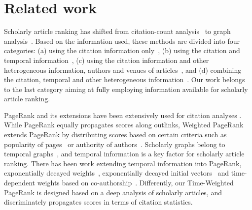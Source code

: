 
\section{Related work} \label{sec-related}



Scholarly article ranking has shifted from citation-count analysis~\cite{Garfield471,Hirsch15112005} to graph analysis~\cite{Waltman2014,Jiang12-MRank,Liang16AAAI,Li08TSRanking,Wang13AAAI,WalkerXKM07,sayyadi09,
Wang16TIST,Ng11KDD}.
Based on the information used, these methods are divided into four categories: (a) using the citation information only~\cite{Garfield471,Hirsch15112005,Ng11KDD}, (b) using the citation and temporal information~\cite{Li08TSRanking,WalkerXKM07}, (c) using the citation information and other heterogeneous information, \eg authors and venues of articles~\cite{Jiang12-MRank,Liang16AAAI}, and (d) combining the citation, temporal and other heterogeneous information~\cite{sayyadi09,Wang16TIST,Wang13AAAI}.
Our work belongs to the last category aiming at fully employing information available for scholarly article ranking.
%



PageRank \cite{Brin98:PageRank} and its extensions have been extensively used for citation analyses \cite{Waltman2014}. While PageRank equally propagates scores along outlinks, Weighted PageRank extends PageRank by distributing scores based on certain criteria such as popularity of pages~\cite{Xing04:WPR} or authority of authors~\cite{Ding11}.
Scholarly graphs belong to temporal graphs~\cite{temporalgraph}, and temporal information is a key factor for scholarly article ranking.
There has been work extending temporal information into PageRank, \eg exponentially decayed weights~\cite{Li08TSRanking}, exponentially decayed initial vectors~\cite{WalkerXKM07} and time-dependent weights based on co-authorship~\cite{FIALA2012370}.
Differently, our Time-Weighted PageRank is designed based on a deep analysis of scholarly articles, and discriminately propagates scores in terms of citation statistics.


